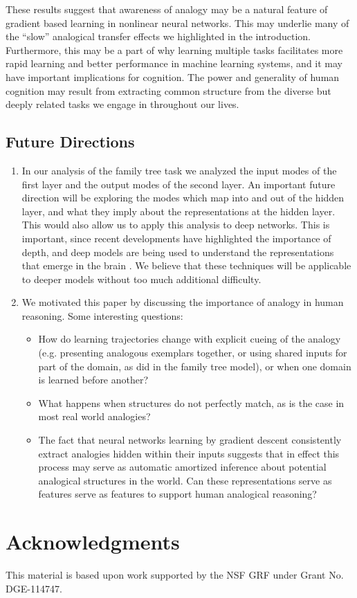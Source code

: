 \documentclass[10pt,letterpaper]{article}
\begin{document}
These results suggest that awareness of analogy may be a natural feature of gradient based learning in nonlinear neural networks. This may underlie many of the ``slow'' analogical transfer effects we highlighted in the introduction. Furthermore, this may be a part of why learning multiple tasks facilitates more rapid learning and better performance in machine learning systems, and it may have important implications for cognition. The power and generality of human cognition may result from extracting common structure from the diverse but deeply related tasks we engage in throughout our lives. 
\subsection{Future Directions}
\begin{enumerate}
\itemsep0em
\item In our analysis of the family tree task we analyzed the input modes of the first layer and the output modes of the second layer. An important future direction will be exploring the modes which map into and out of the hidden layer, and what they imply about the representations at the hidden layer. This would also allow us to apply this analysis to deep networks. This is important, since recent developments have highlighted the importance of depth, and deep models are being used to understand the representations that emerge in the brain \citep[e.g.]{Yamins2016a}. We believe that these techniques will be applicable to deeper models without too much additional difficulty. 
\item We motivated this paper by discussing the importance of analogy in human reasoning. Some interesting questions:
\begin{itemize}
\itemsep0em
\item How do learning trajectories change with explicit cueing of the analogy (e.g. presenting analogous exemplars together, or using shared inputs for part of the domain, as \citet{Hinton1986} did in the family tree model), or when one domain is learned before another?
\item What happens when structures do not perfectly match, as is the case in most real world analogies?
\item The fact that neural networks learning by gradient descent consistently extract analogies hidden within their inputs suggests that in effect this process may serve as automatic amortized inference about potential analogical structures in the world. Can these representations serve as features serve as features to support human analogical reasoning? 
\end{itemize}
\end{enumerate}
\section{Acknowledgments}
This material is based upon work supported by the NSF GRF under Grant No. DGE-114747.


\setlength{\bibleftmargin}{.125in}
\setlength{\bibindent}{-\bibleftmargin}


\end{document}
